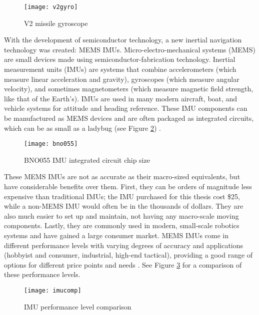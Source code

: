 \documentclass[12pt,a4paper]{report}
\begin{document}
\begin{figure}[htbp]
	\centering
	\texttt{[image: v2gyro]}
	\caption{V2 missile gyroscope \cite{v2missile}}
	\label{fig:v2gyro}
\end{figure}

With the development of semiconductor technology, a new inertial navigation technology was created: MEMS IMUs. Micro-electro-mechanical systems (MEMS) are small devices made using semiconductor-fabrication technology. Inertial measurement units (IMUs) are systems that combine accelerometers (which measure linear acceleration and gravity), gyroscopes (which measure angular velocity), and sometimes magnetometers (which measure magnetic field strength, like that of the Earth’s). IMUs are used in many modern aircraft, boat, and vehicle systems for attitude and heading reference. These IMU components can be manufactured as MEMS devices and are often packaged as integrated circuits, which can be as small as a ladybug (see Figure \ref{fig:bno055}) \cite{imuadvnav}.

\begin{figure}[htbp]
	\centering
	\texttt{[image: bno055]}
	\caption{BNO055 IMU integrated circuit chip size \cite{bno055}}
	\label{fig:bno055}
\end{figure}

These MEMS IMUs are not as accurate as their macro-sized equivalents, but have considerable benefits over them. First, they can be orders of magnitude less expensive than traditional IMUs; the IMU purchased for this thesis cost \$25, while a non-MEMS IMU would often be in the thousands of dollars. They are also much easier to set up and maintain, not having any macro-scale moving components. Lastly, they are commonly used in modern, small-scale robotics systems and have gained a large consumer market. MEMS IMUs come in different performance levels with varying degrees of accuracy and applications (hobbyist and consumer, industrial, high-end tactical), providing a good range of options for different price points and needs \cite{imuadvnav}. See Figure \ref{fig:imucomp} for a comparison of these performance levels.

\begin{figure}[htbp]
	\centering
	\texttt{[image: imucomp]}
	\caption{IMU performance level comparison \cite{imuadvnav}}
	\label{fig:imucomp}
\end{figure}
\end{document}
